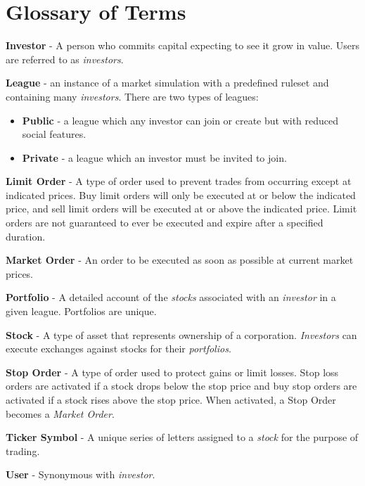 \section{Glossary of Terms}

{
\raggedright
\textbf{Investor} - A person who commits capital expecting to see it grow in value. Users are referred 
to as \emph{investors}.

\textbf{League} - an instance of a market simulation with a predefined ruleset and containing many 
\emph{investors}. There are two types of leagues:

\begin{itemize}
\item \textbf{ Public} - a league which any investor can join or create but with reduced
social features.
\item \textbf{ Private} - a league which an investor must be invited to join.
\end{itemize}

\textbf{Limit Order} - A type of order used to prevent trades from occurring except at indicated
prices. Buy limit orders will only be executed at or below the indicated price, and sell limit
orders will be executed at or above the indicated price. Limit orders are not guaranteed to ever
be executed and expire after a specified duration.

\textbf{Market Order} - An order to be executed as soon as possible at current market prices.

\textbf{Portfolio} - A detailed account of the \emph{stocks} associated with an \emph{investor} 
in a given league. Portfolios are unique. 

\textbf{Stock} - A type of asset that represents ownership of a corporation. \emph{Investors} can
execute exchanges against stocks for their \emph{portfolios}.

\textbf{Stop Order} - A type of order used to protect gains or limit losses. Stop loss
orders are activated if a stock drops below the stop price and buy stop orders
are activated if a stock rises above the stop price. When activated, a Stop Order becomes a
\emph{Market Order}. 

\textbf{Ticker Symbol} - A unique series of letters assigned to a \emph{stock} for the purpose of
trading.

\textbf{User} - Synonymous with \emph{investor}.

}
